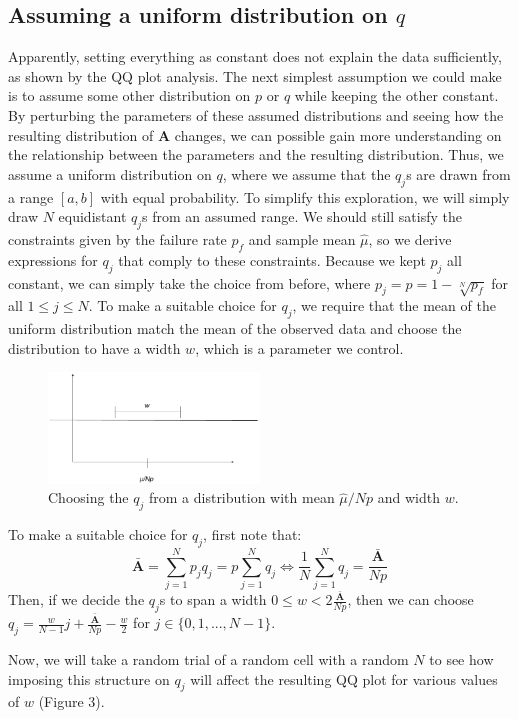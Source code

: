 \documentclass{article}
\newcommand{\rv}[1] {
\text{$\bm{#1}$}
}
\begin{document}
\subsection{Assuming a uniform distribution on $q$}
Apparently, setting everything as constant does not explain the data sufficiently, as shown by the QQ plot analysis. The next simplest assumption we could make is to assume some other distribution on $p$ or $q$ while keeping the other constant. By perturbing the parameters of these assumed distributions and seeing how the resulting distribution of $\rv{A}$ changes, we can possible gain more understanding on the relationship between the parameters and the resulting distribution. Thus, we assume a uniform distribution on $q$, where we assume that the $q_j$s are drawn from a range $[a,b]$ with equal probability. To simplify this exploration, we will simply draw $N$ equidistant $q_j$s from an assumed range. We should still satisfy the constraints given by the failure rate $p_f$ and sample mean $\hat{\mu}$, so we derive expressions for $q_j$ that comply to these constraints. Because we kept $p_j$ all constant, we can simply take the choice from before, where $p_j = p = 1 - \sqrt[N]{p_f}$ for all $1 \leq j \leq N$. To make a suitable choice for $q_j$, we require that the mean of the uniform distribution match the mean of the observed data and choose the distribution to have a width $w$, which is a parameter we control.

\begin{figure}[h]
  \centering
  \caption{Choosing the $q_j$ from a distribution with mean $\hat{\mu}/Np$ and width $w$.}
  \includegraphics[width=0.5\textwidth]{uniform}
\end{figure}

To make a suitable choice for $q_j$, first note that:
\[
  \rv{\bar{A}} = \sum_{j=1}^N p_jq_j = p\sum_{j=1}^N q_j \iff \frac{1}{N}\sum_{j=1}^N q_j = \frac{\rv{\bar{A}}}{Np}
\]
Then, if we decide the $q_j$s to span a width $0 \leq w < 2\frac{\rv{\bar{A}}}{Np}$, then we can choose $q_j = \frac{w}{N-1}j + \frac{\rv{\bar{A}}}{Np} - \frac{w}{2}$ for $j \in \{0,1,...,N-1\}$.

Now, we will take a random trial of a random cell with a random $N$ to see how imposing this structure on $q_j$ will affect the resulting QQ plot for various values of $w$ (Figure 3).
\end{document}

